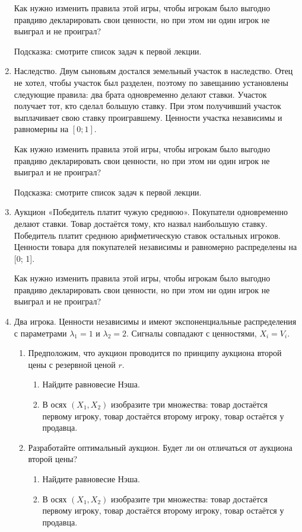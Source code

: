 \begin{enumerate}
Как нужно изменить правила этой игры, чтобы игрокам было выгодно правдиво декларировать свои ценности, но при этом ни один игрок не выиграл и не проиграл?

Подсказка: смотрите список задач к первой лекции.

\item Наследство. Двум сыновьям достался земельный участок в наследство. Отец не хотел, чтобы участок был разделен, поэтому по завещанию установлены следующие правила: два брата одновременно делают ставки. Участок получает тот, кто сделал большую ставку. При этом получивший участок выплачивает свою ставку проигравшему.
Ценности участка независимы и равномерны на $[0; 1]$.

Как нужно изменить правила этой игры, чтобы игрокам было выгодно правдиво декларировать свои ценности, но при этом ни один игрок не выиграл и не проиграл?

Подсказка: смотрите список задач к первой лекции.

\item Аукцион «Победитель платит чужую среднюю». Покупатели одновременно делают
ставки. Товар достаётся тому, кто назвал наибольшую ставку. Победитель платит
среднюю арифметическую ставок остальных игроков. Ценности товара для покупателей независимы и равномерно распределены на [0; 1].

Как нужно изменить правила этой игры, чтобы игрокам было выгодно правдиво декларировать свои ценности, но при этом ни один игрок не выиграл и не проиграл?

\item Два игрока. Ценности независимы и имеют экспоненциальные распределения с параметрами $ \lambda_{1}=1 $ и $\lambda_{2}=2  $. Сигналы совпадают с ценностями,  $ X_{i}=V_{i} $.

\begin{enumerate}
\item Предположим, что аукцион проводится по принципу аукциона второй цены с резервной ценой $ r $.
\begin{enumerate}
\item Найдите равновесие Нэша.
\item В осях $ (X_{1},X_{2}) $ изобразите три множества: товар достаётся первому игроку, товар достаётся второму игроку, товар остаётся у продавца.
\end{enumerate}
\item Разработайте оптимальный аукцион. Будет ли он отличаться от аукциона второй цены?
\begin{enumerate}
\item Найдите равновесие Нэша.
\item В осях $ (X_{1},X_{2}) $ изобразите три множества: товар достаётся первому игроку, товар достаётся второму игроку, товар остаётся у продавца.
\end{enumerate}
\end{enumerate}


\end{enumerate}

